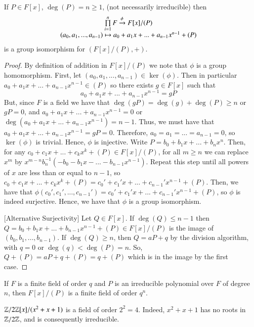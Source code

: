 \documentclass[12pt, a4paper, oneside, openright, titlepage]{book}
\begin{document}
\begin{rmk}
    If $P \in F[x]$, $\deg(P) = n\geq 1$, (not necessarily irreducible) then \begin{equation}
        \begin{array}{c} \prod\limits_{i=1}^nF \xrightarrow{\phi} F[x]/(P) \\ (a_0,a_1,...,a_{n-1}) \mapsto a_0+a_1x+...+a_{n-1}x^{n-1}+(P) \end{array}
    \end{equation}
    is a group isomorphism for $(F[x]/(P),+)$.
    \begin{proof}
        By definition of addition in $F[x]/(P)$ we note that $\phi$ is a group homomorphism. First, let $(a_0,a_1,...,a_{n-1}) \in \ker(\phi)$. Then in particular $a_0+a_1x+...+a_{n-1}x^{n-1} \in (P)$ so there exists $g \in F[x]$ such that $$a_0+a_1x+...+a_{n-1}x^{n-1} = gP$$ But, since $F$ is a field we have that $\deg(gP) = \deg(g) + \deg(P) \geq n$ or $gP = 0$, and $a_0+a_1x+...+a_{n-1}x^{n-1} = 0$ or $\deg(a_0+a_1x+...+a_{n-1}x^{n-1}) = n-1$. Thus, we must have that $a_0+a_1x+...+a_{n-1}x^{n-1} = gP = 0$. Therefore, $a_0 = a_1 =...= a_{n-1} = 0$, so $\ker(\phi)$ is trivial. Hence, $\phi$ is injective. Write $P = b_0 + b_1x + ... + b_nx^n$. Then, for any $c_0+c_1x+...+c_kx^k + (P) \in F[x]/(P)$, for all $m \geq n$ we can replace $x^m$ by $x^{m-n}b_n^{-1}(-b_0-b_1x-...-b_{n-1}x^{n-1})$. Repeat this step until all powers of $x$ are less than or equal to $n-1$, so $c_0+c_1x+...+c_kx^k + (P) = c_0'+c_1'x+...+c_{n-1}'x^{n-1} + (P)$. Then, we have that $\phi(c_0',c_1',...,c_{n-1}') = c_0'+c_1'x+...+c_{n-1}'x^{n-1} + (P)$, so $\phi$ is indeed surjective. Hence, we have that $\phi$ is a group isomorphism.


        [Alternative Surjectivity] Let $Q \in F[x]$. If $\deg(Q) \leq n-1$ then $Q = b_0+b_1x+...+b_{n-1}x^{n-1} + (P) \in F[x]/(P)$ is the image of $(b_0,b_1,...,b_{n-1})$. If $\deg(Q) \geq n$, then $Q = aP+q$ by the division algorithm, with $q = 0$ or $\deg(q) < \deg(P) = n$. So, $Q+(P) = aP+q+(P) = q+(P)$ which is in the image by the first case.
    \end{proof}
\end{rmk}


\begin{cor}
    If $F$ is a finite field of order $q$ and $P$ is an irreducible polynomial over $F$ of degree $n$, then $F[x]/(P)$ is a finite field of order $q^n$.
\end{cor}


\begin{eg}
    $\mathbb Z/2\mathbb Z[x]/(x^2+x+1)$ is a field of order $2^2 = 4$. Indeed, $x^2+x+1$ has no roots in $\mathbb Z/2\mathbb Z$, and is consequently irreducible.
\end{eg}
\end{document}
